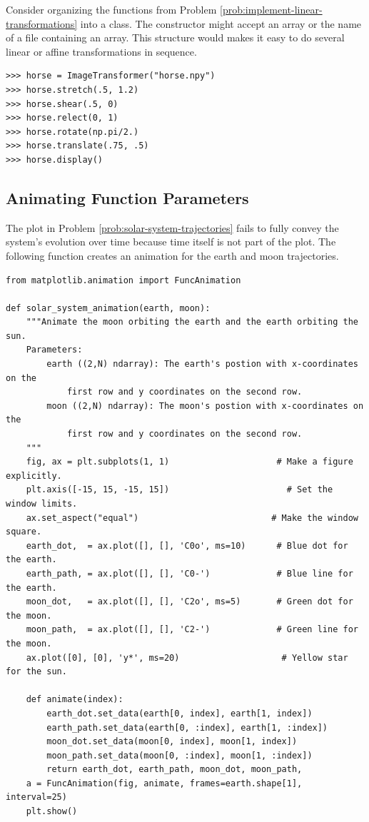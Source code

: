 Consider organizing the functions from Problem \ref{prob:implement-linear-transformations} into a class.
The constructor might accept an array or the name of a file containing an array.
This structure would makes it easy to do several linear or affine transformations in sequence.

\begin{lstlisting}
>>> horse = ImageTransformer("horse.npy")
>>> horse.stretch(.5, 1.2)
>>> horse.shear(.5, 0)
>>> horse.relect(0, 1)
>>> horse.rotate(np.pi/2.)
>>> horse.translate(.75, .5)
>>> horse.display()
\end{lstlisting}

\subsection*{Animating Function Parameters} %

The plot in Problem \ref{prob:solar-system-trajectories} fails to fully convey the system's evolution over time because time itself is not part of the plot.
The following function creates an animation for the earth and moon trajectories.

\begin{lstlisting}
from matplotlib.animation import FuncAnimation

def solar_system_animation(earth, moon):
    """Animate the moon orbiting the earth and the earth orbiting the sun.
    Parameters:
        earth ((2,N) ndarray): The earth's postion with x-coordinates on the
            first row and y coordinates on the second row.
        moon ((2,N) ndarray): The moon's postion with x-coordinates on the
            first row and y coordinates on the second row.
    """
    fig, ax = plt.subplots(1, 1)                     # Make a figure explicitly.
    plt.axis([-15, 15, -15, 15])                       # Set the window limits.
    ax.set_aspect("equal")                          # Make the window square.
    earth_dot,  = ax.plot([], [], 'C0o', ms=10)      # Blue dot for the earth.
    earth_path, = ax.plot([], [], 'C0-')             # Blue line for the earth.
    moon_dot,   = ax.plot([], [], 'C2o', ms=5)       # Green dot for the moon.
    moon_path,  = ax.plot([], [], 'C2-')             # Green line for the moon.
    ax.plot([0], [0], 'y*', ms=20)                    # Yellow star for the sun.

    def animate(index):
        earth_dot.set_data(earth[0, index], earth[1, index])
        earth_path.set_data(earth[0, :index], earth[1, :index])
        moon_dot.set_data(moon[0, index], moon[1, index])
        moon_path.set_data(moon[0, :index], moon[1, :index])
        return earth_dot, earth_path, moon_dot, moon_path,
    a = FuncAnimation(fig, animate, frames=earth.shape[1], interval=25)
    plt.show()
\end{lstlisting}

